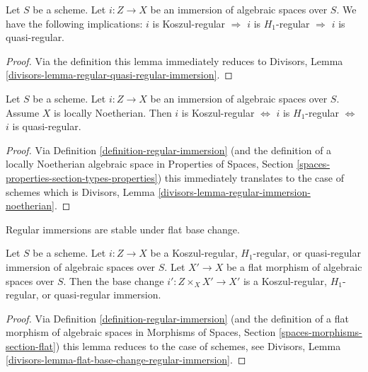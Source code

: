 \begin{lemma}
\label{lemma-regular-quasi-regular-immersion}
Let $S$ be a scheme.
Let $i : Z \to X$ be an immersion of algebraic spaces over $S$.
We have the following implications:
$i$ is Koszul-regular $\Rightarrow$
$i$ is $H_1$-regular $\Rightarrow$
$i$ is quasi-regular.
\end{lemma}

\begin{proof}
Via the definition this lemma immediately reduces to
Divisors, Lemma \ref{divisors-lemma-regular-quasi-regular-immersion}.
\end{proof}

\begin{lemma}
\label{lemma-regular-immersion-noetherian}
Let $S$ be a scheme.
Let $i : Z \to X$ be an immersion of algebraic spaces over $S$.
Assume $X$ is locally Noetherian. Then
$i$ is Koszul-regular $\Leftrightarrow$
$i$ is $H_1$-regular $\Leftrightarrow$
$i$ is quasi-regular.
\end{lemma}

\begin{proof}
Via Definition \ref{definition-regular-immersion}
(and the definition of a locally Noetherian algebraic space
in Properties of Spaces, Section
\ref{spaces-properties-section-types-properties})
this immediately translates to the case of schemes which is
Divisors, Lemma \ref{divisors-lemma-regular-immersion-noetherian}.
\end{proof}

\begin{lemma}
\label{lemma-flat-base-change-regular-immersion}
\begin{slogan}
Regular immersions are stable under flat base change.
\end{slogan}
Let $S$ be a scheme. Let $i : Z \to X$ be a Koszul-regular,
$H_1$-regular, or quasi-regular immersion of algebraic spaces over $S$.
Let $X' \to X$ be a flat morphism of algebraic spaces over $S$.
Then the base change $i' : Z \times_X X' \to X'$ is a Koszul-regular,
$H_1$-regular, or quasi-regular immersion.
\end{lemma}

\begin{proof}
Via Definition \ref{definition-regular-immersion}
(and the definition of a flat morphism of algebraic spaces
in Morphisms of Spaces, Section
\ref{spaces-morphisms-section-flat})
this lemma reduces to the case of schemes, see
Divisors, Lemma \ref{divisors-lemma-flat-base-change-regular-immersion}.
\end{proof}

